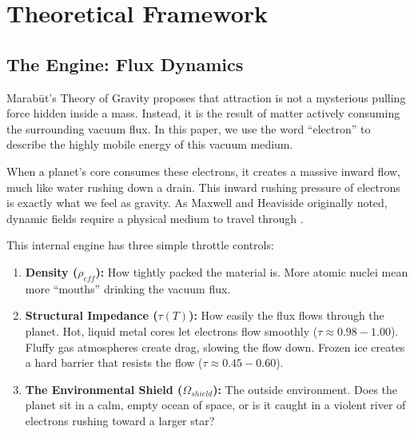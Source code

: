 \documentclass[11pt, a4paper]{article}
\begin{document}
\section{Theoretical Framework}

\subsection{The Engine: Flux Dynamics}
  Marab\={u}t's Theory of Gravity proposes that attraction is not a mysterious pulling force hidden inside a mass. Instead, it is the result of matter actively consuming the surrounding vacuum flux. In this paper, we use the word ``electron'' to describe the highly mobile energy of this vacuum medium. 
  
  When a planet's core consumes these electrons, it creates a massive inward flow, much like water rushing down a drain. This inward rushing pressure of electrons is exactly what we feel as gravity. As Maxwell and Heaviside originally noted, dynamic fields require a physical medium to travel through \cite{maxwell1865, heaviside1893}.

  This internal engine has three simple throttle controls:
  \begin{enumerate}
    \item \textbf{Density ($\rho_{eff}$):} How tightly packed the material is. More atomic nuclei mean more ``mouths'' drinking the vacuum flux.
    \item \textbf{Structural Impedance ($\tau(T)$):} How easily the flux flows through the planet. Hot, liquid metal cores let electrons flow smoothly ($\tau \approx 0.98 - 1.00$). Fluffy gas atmospheres create drag, slowing the flow down. Frozen ice creates a hard barrier that resists the flow ($\tau \approx 0.45 - 0.60$).
    \item \textbf{The Environmental Shield ($\Omega_{shield}$):} The outside environment. Does the planet sit in a calm, empty ocean of space, or is it caught in a violent river of electrons rushing toward a larger star?
  \end{enumerate}

\end{document}
